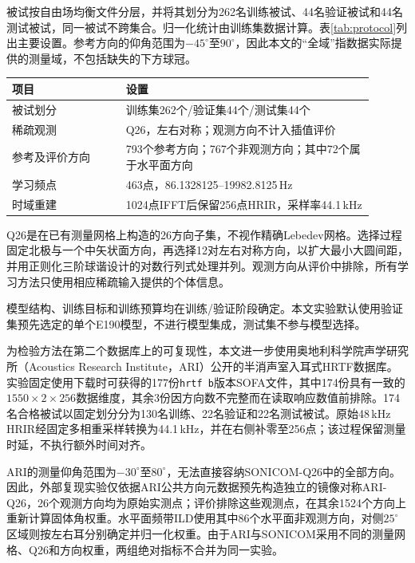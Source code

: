 \documentclass[UTF8,a4paper]{article}
\begin{document}
被试按自由场均衡文件分层，并将其划分为262名训练被试、44名验证被试和44名测试被试，同一被试不跨集合。归一化统计由训练集数据计算。表\ref{tab:protocol}列出主要设置。参考方向的仰角范围为$-45^\circ$至$90^\circ$，因此本文的“全域”指数据实际提供的测量域，不包括缺失的下方球冠。

\begin{table}[htbp]
\centering\small
{}
\begin{tabular}{p{0.29\linewidth}p{0.61\linewidth}}
\toprule
项目 & 设置\\
\midrule
被试划分 & 训练集262个/验证集44个/测试集44个\\
稀疏观测 & Q26，左右对称；观测方向不计入插值评价\\
参考及评价方向 & 793个参考方向；767个非观测方向；其中72个属于水平面方向\\
学习频点 & 463点，86.1328125--19982.8125\,Hz\\
时域重建 & 1024点IFFT后保留256点HRIR，采样率44.1\,kHz\\
\bottomrule
\end{tabular}
\end{table}

Q26是在已有测量网格上构造的26方向子集，不视作精确Lebedev网格。选择过程固定北极与一个中矢状面方向，再选择12对左右对称方向，以扩大最小大圆间距，并用正则化三阶球谐设计的对数行列式处理并列。观测方向从评价中排除，所有学习方法只使用相应稀疏输入提供的个体信息。

模型结构、训练目标和训练预算均在训练/验证阶段确定。本文实验默认使用验证集预先选定的单个E190模型，不进行模型集成，测试集不参与模型选择。

为检验方法在第二个数据库上的可复现性，本文进一步使用奥地利科学院声学研究所（Acoustics Research Institute，ARI）公开的半消声室入耳式HRTF数据库\cite{R20}。实验固定使用下载时可获得的177份\texttt{hrtf b}版本SOFA文件，其中174份具有一致的$1550\times2\times256$数据维度，其余3份因方向数不完整而在读取响应数值前排除。174名合格被试以固定划分分为130名训练、22名验证和22名测试被试。原始48\,kHz HRIR经固定多相重采样转换为44.1\,kHz，并在右侧补零至256点；该过程保留测量时延，不执行额外时间对齐。

ARI的测量仰角范围为$-30^\circ$至$80^\circ$，无法直接容纳SONICOM-Q26中的全部方向。因此，外部复现实验仅依据ARI公共方向元数据预先构造独立的镜像对称ARI-Q26，26个观测方向均为原始实测点；评价排除这些观测点，在其余1524个方向上重新计算固体角权重。水平面频带ILD使用其中86个水平面非观测方向，对侧$25^\circ$区域则按左右耳分别确定并归一化权重。由于ARI与SONICOM采用不同的测量网格、Q26和方向权重，两组绝对指标不合并为同一实验。
\end{document}
